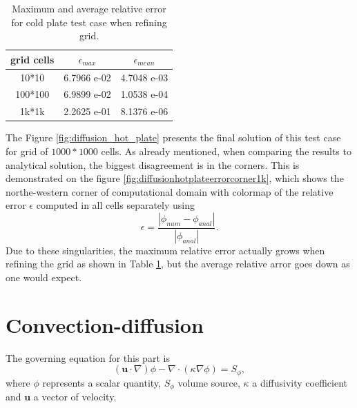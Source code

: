 \documentclass[]{article}
\begin{document}
\begin{table}
	\centering
	\begin{tabular}{|c|c|c|}
		\hline
		grid cells & $ \epsilon_{max} $ & $ \epsilon_{mean} $\\
		\hline
		10*10 & 6.7966 e-02 & 4.7048 e-03 \\
		\hline
		100*100 &  6.9899 e-02 & 1.0538 e-04 \\
		\hline
		1k*1k & 2.2625 e-01 & 8.1376 e-06 \\
		\hline
	\end{tabular}
	\caption{Maximum and average relative error for cold plate test case when refining grid.}
	\label{tab:diffusion_hot_plate_grid}
\end{table}

The Figure \ref{fig:diffusion_hot_plate} presents the final solution of this test case for grid of $ 1000*1000 $ cells. As already mentioned, when comparing the results to analytical solution, the biggest disagreement is in the corners. This is demonstrated on the figure \ref{fig:diffusionhotplateerrorcorner1k}, which shows the northe-western corner of computational domain with colormap of the relative error $ \epsilon $ computed in all cells separately using 
\begin{equation}
\epsilon = \dfrac{|\phi_{num}-\phi_{anal}|}{|\phi_{anal}|}.
\end{equation}
Due to these singularities, the maximum relative error actually grows when refining the grid as shown in Table \ref{tab:diffusion_hot_plate_grid}, but the average relative arror goes down as one would expect. 


\section{Convection-diffusion}
The governing equation for this part is 
\begin{equation}\label{eq:convection}
(\mathbf{u} \cdot \nabla)\phi - \nabla \cdot (\kappa\nabla\phi) = S_\phi,
\end{equation}
where $ \phi $ represents a scalar quantity, $ S_\phi $ volume source, $ \kappa $ a diffusivity coefficient and $ \mathbf{u} $ a vector of velocity.
\end{document}
